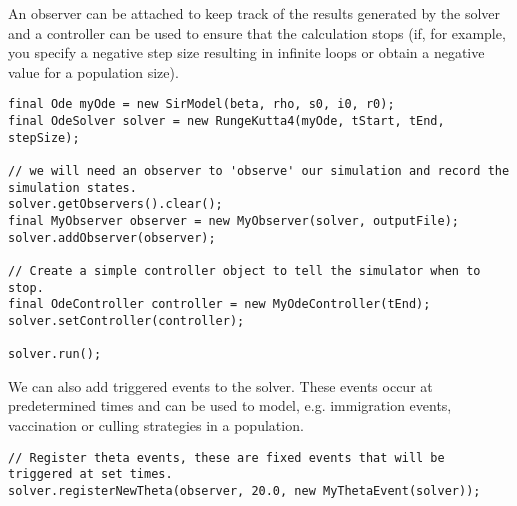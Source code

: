 An observer can be attached to keep track of the results generated by the solver and a controller can be used to ensure that the calculation stops (if, for example, you specify a negative step size resulting in infinite loops or obtain a negative value for a population size). 

\begin{lstlisting}
final Ode myOde = new SirModel(beta, rho, s0, i0, r0);
final OdeSolver solver = new RungeKutta4(myOde, tStart, tEnd, stepSize);

// we will need an observer to 'observe' our simulation and record the simulation states.
solver.getObservers().clear();
final MyObserver observer = new MyObserver(solver, outputFile);
solver.addObserver(observer);

// Create a simple controller object to tell the simulator when to stop.
final OdeController controller = new MyOdeController(tEnd);
solver.setController(controller);

solver.run();
\end{lstlisting}

We can also add triggered events to the solver. These events occur at predetermined times and can be used to model, e.g. immigration events, vaccination or culling strategies in a population.
\begin{lstlisting}
// Register theta events, these are fixed events that will be triggered at set times.
solver.registerNewTheta(observer, 20.0, new MyThetaEvent(solver));
\end{lstlisting}

